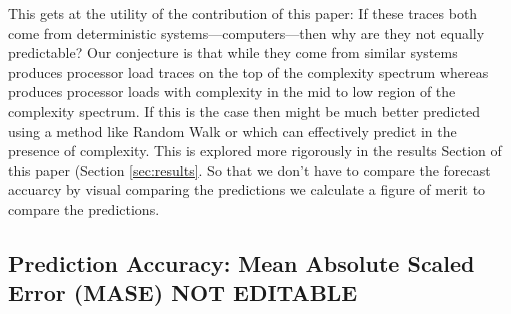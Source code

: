 This gets at the utility of the contribution of this paper: If these traces both come from deterministic
systems---computers---then why are they not equally predictable?  Our
conjecture is that while they come from similar systems \gcc produces processor load traces on the top of the complexity spectrum whereas \col produces processor loads with complexity in the mid to low region of the complexity spectrum. If this is the case then \gcc might be much better predicted using a method like Random Walk or \naive which can effectively predict in the presence of complexity. This is explored more rigorously in the results Section of this paper (Section \ref{sec:results}. So that we don't have to compare the forecast accuarcy by visual comparing the predictions we calculate a figure of merit to compare the predictions. 







\subsection{Prediction Accuracy: Mean Absolute Scaled Error (MASE) {\color{red} NOT EDITABLE}}
\label{sec:accuracy}

